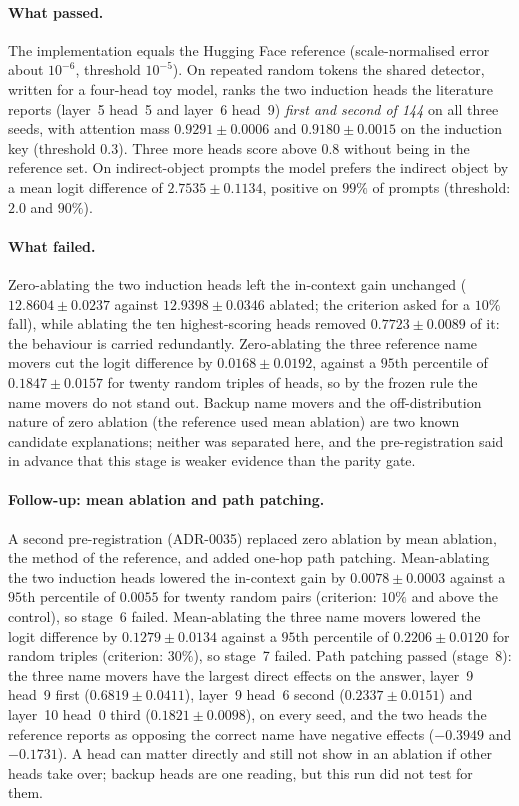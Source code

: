 \documentclass[11pt]{article}
\begin{document}
\paragraph{What passed.} The implementation equals the Hugging Face reference
(scale-normalised error about $10^{-6}$, threshold $10^{-5}$). On repeated random
tokens the shared detector, written for a four-head toy model, ranks the two
induction heads the literature reports (layer~5 head~5 and layer~6 head~9)
\emph{first and second of 144} on all three seeds, with attention mass
$0.9291 \pm 0.0006$ and $0.9180 \pm 0.0015$ on the induction key
(threshold $0.3$). Three more heads score above $0.8$ without being in the
reference set. On indirect-object prompts the model prefers the indirect object by
a mean logit difference of $2.7535 \pm 0.1134$, positive on
$99\%$ of prompts (threshold: $2.0$ and $90\%$).

\paragraph{What failed.} Zero-ablating the two induction heads left the
in-context gain unchanged ($12.8604 \pm 0.0237$ against $12.9398 \pm 0.0346$
ablated; the criterion asked for a $10\%$ fall), while ablating the ten
highest-scoring heads removed $0.7723 \pm 0.0089$ of it:
the behaviour is carried redundantly. Zero-ablating the three reference name
movers cut the logit difference by $0.0168 \pm 0.0192$, against a
$95$th percentile of $0.1847 \pm 0.0157$ for twenty random triples of
heads, so by the frozen rule the name movers do not stand out. Backup name movers
and the off-distribution nature of zero ablation (the reference used mean ablation)
are two known candidate explanations; neither was separated here, and the
pre-registration said in advance that this stage is weaker evidence than the
parity gate.

\paragraph{Follow-up: mean ablation and path patching.} A second pre-registration
(ADR-0035) replaced zero ablation by mean ablation, the method of the reference,
and added one-hop path patching. Mean-ablating the two induction heads lowered the
in-context gain by $0.0078 \pm 0.0003$ against a $95$th percentile of $0.0055$
for twenty random pairs (criterion: $10\%$ and above the control), so stage~6
failed. Mean-ablating the three name movers lowered the logit difference by
$0.1279 \pm 0.0134$ against a $95$th percentile of $0.2206 \pm 0.0120$ for random
triples (criterion: $30\%$), so stage~7 failed. Path patching passed (stage~8):
the three name movers have the largest direct effects on the answer, layer~9 head~9
first ($0.6819 \pm 0.0411$), layer~9 head~6 second ($0.2337 \pm 0.0151$) and
layer~10 head~0 third ($0.1821 \pm 0.0098$), on every seed, and the two heads the
reference reports as opposing the correct name have negative effects
($-0.3949$ and $-0.1731$). A head can matter directly and still not show in an
ablation if other heads take over; backup heads are one reading, but this run did
not test for them.
\end{document}
